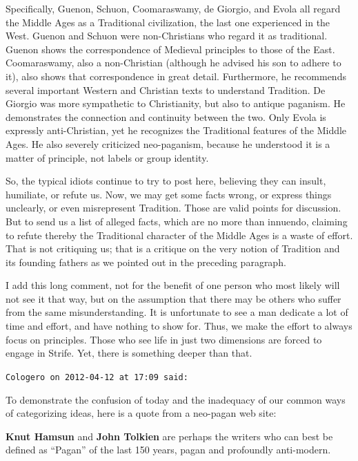 \begin{footnotesize}
\begin{sffamily}
Specifically, Guenon, Schuon, Coomaraswamy, de Giorgio, and Evola all regard the Middle Ages as a Traditional civilization, the last one experienced in the West. Guenon and Schuon were non-Christians who regard it as traditional. Guenon shows the correspondence of Medieval principles to those of the East. Coomaraswamy, also a non-Christian (although he advised his son to adhere to it), also shows that correspondence in great detail. Furthermore, he recommends several important Western and Christian texts to understand Tradition. De Giorgio was more sympathetic to Christianity, but also to antique paganism. He demonstrates the connection and continuity between the two. Only Evola is expressly anti-Christian, yet he recognizes the Traditional features of the Middle Ages. He also severely criticized neo-paganism, because he understood it is a matter of principle, not labels or group identity.

So, the typical idiots continue to try to post here, believing they can insult, humiliate, or refute us. Now, we may get some facts wrong, or express things unclearly, or even misrepresent Tradition. Those are valid points for discussion. But to send us a list of alleged facts, which are no more than innuendo, claiming to refute thereby the Traditional character of the Middle Ages is a waste of effort. That is not critiquing us; that is a critique on the very notion of Tradition and its founding fathers as we pointed out in the preceding paragraph.

I add this long comment, not for the benefit of one person who most likely will not see it that way, but on the assumption that there may be others who suffer from the same misunderstanding. It is unfortunate to see a man dedicate a lot of time and effort, and have nothing to show for. Thus, we make the effort to always focus on principles. Those who see life in just two dimensions are forced to engage in Strife. Yet, there is something deeper than that.

\hfill

\texttt{Cologero on 2012-04-12 at 17:09 said:}

To demonstrate the confusion of today and the inadequacy of our common ways of categorizing ideas, here is a quote from a neo-pagan web site:

\begin{quotex}\footnotesize

\textbf{Knut Hamsun} and \textbf{John Tolkien} are perhaps the writers who can best be defined as ``Pagan'' of the last 150 years, pagan and profoundly anti-modern.
\end{quotex}



\end{sffamily}
\end{footnotesize}
